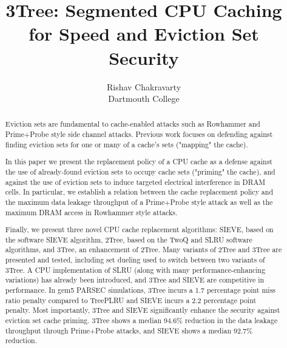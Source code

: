 \documentclass[letterpaper]{article}
\begin{document}

\date{}

\title{3Tree: Segmented CPU Caching for Speed and Eviction Set
  Security}

\author{
{\rm Rishav Chakravarty}\\
Dartmouth College
} %

\maketitle

\begin{abstract}

  Eviction sets are fundamental to cache-enabled attacks such as Rowhammer
  and Prime+Probe style side channel attacks.
  Previous work focuses on defending against finding eviction sets for one or many
  of a cache's sets ("mapping" the cache).

  In this paper we present the replacement policy of a CPU cache as a defense against
  the use of already-found eviction sets to occupy cache sets ("priming" the cache),
	and against the use of eviction sets to induce targeted electrical interference in DRAM cells.
  In particular, we establish a relation between the cache replacement policy and the
  maximum data leakage throughput of a Prime+Probe style attack as well as the
  maximum DRAM access in Rowhammer style attacks.

	Finally, we present three novel CPU cache replacement algorithms:
	SIEVE, based on the software SIEVE algorithm,
	2Tree, based on the TwoQ and SLRU software algorithms,
	and 3Tree, an enhancement of 2Tree.
	Many variants of 2Tree and 3Tree are presented and tested, including
	set dueling used to switch between two variants of 3Tree.
  A CPU implementation of SLRU (along with many performance-enhancing variations) has
  already been introduced, and 3Tree and SIEVE are competitive in performance.
  In gem5 PARSEC simulations, 3Tree incurs a 1.7 percentage point miss ratio penalty
  compared to TreePLRU and SIEVE incurs a 2.2 percentage point penalty.
  Most importantly, 3Tree and SIEVE significantly enhance the security against eviction set
  cache priming.
  3Tree shows a median 94.6\% reduction in the data leakage throughput through Prime+Probe attacks,
  and SIEVE shows a median 92.7\% reduction.

\end{abstract}
\end{document}
